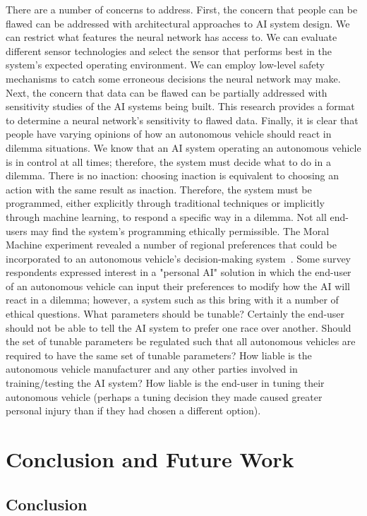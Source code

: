 \documentclass[paper=a4paper]{report}
\begin{document}
There are a number of concerns to address. First, the concern that people can be flawed can be
addressed with architectural approaches to AI system design. We can restrict what features the
neural network has access to. We can evaluate different sensor technologies and select the sensor
that performs best in the system's expected operating environment. We can employ low-level safety
mechanisms to catch some erroneous decisions the neural network may make. Next, the concern that
data can be flawed can be partially addressed with sensitivity studies of the AI systems being
built. This research provides a format to determine a neural network's sensitivity to flawed data.
Finally, it is clear that people have varying opinions of how an autonomous vehicle should react in
dilemma situations. We know that an AI system operating an autonomous vehicle is in control at all
times; therefore, the system must decide what to do in a dilemma. There is no inaction: choosing
inaction is equivalent to choosing an action with the same result as inaction. Therefore, the system
must be programmed, either explicitly through traditional techniques or implicitly through machine
learning, to respond a specific way in a dilemma. Not all end-users may find the system's
programming ethically permissible. The Moral Machine experiment revealed a number of regional
preferences that could be incorporated to an autonomous vehicle's decision-making
system~\cite{awad2018moral}. Some survey respondents expressed interest in a "personal AI" solution
in which the end-user of an autonomous vehicle can input their preferences to modify how the AI will
react in a dilemma; however, a system such as this bring with it a number of ethical questions. What
parameters should be tunable? Certainly the end-user should not be able to tell the AI system to
prefer one race over another. Should the set of tunable parameters be regulated such that all
autonomous vehicles are required to have the same set of tunable parameters? How liable is the
autonomous vehicle manufacturer and any other parties involved in training/testing the AI system?
How liable is the end-user in tuning their autonomous vehicle (perhaps a tuning decision they made
caused greater personal injury than if they had chosen a different option).

\FloatBarrier
\chapter{Conclusion and Future Work}
\section{Conclusion}
\end{document}
